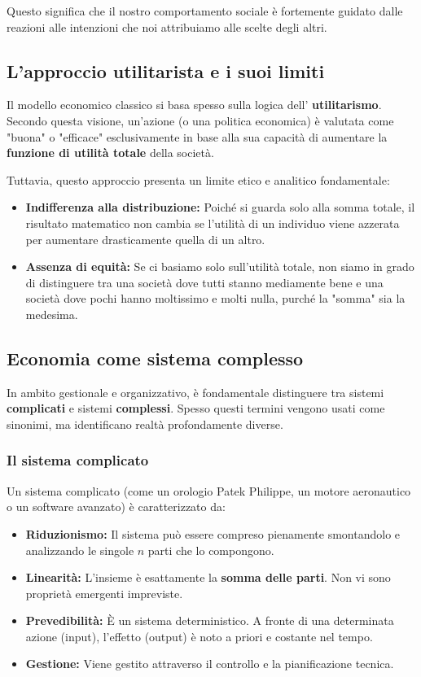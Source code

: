 \documentclass[a4paper,12pt]{article}
\begin{document}
	Questo significa che il nostro comportamento sociale è fortemente guidato dalle reazioni alle intenzioni che noi attribuiamo alle scelte degli altri.
	\subsection{L'approccio utilitarista e i suoi limiti}
	Il modello economico classico si basa spesso sulla logica dell' \textbf{utilitarismo}. Secondo questa visione, un'azione (o una politica economica) è valutata come "buona" o "efficace" esclusivamente in base alla sua capacità di aumentare la \textbf{funzione di utilità totale} della società.
	
	Tuttavia, questo approccio presenta un limite etico e analitico fondamentale:
	\begin{itemize}
		\item \textbf{Indifferenza alla distribuzione:} Poiché si guarda solo alla somma totale, il risultato matematico non cambia se l'utilità di un individuo viene azzerata per aumentare drasticamente quella di un altro. 
		\item \textbf{Assenza di equità:} Se ci basiamo solo sull'utilità totale, non siamo in grado di distinguere tra una società dove tutti stanno mediamente bene e una società dove pochi hanno moltissimo e molti nulla, purché la "somma" sia la medesima.
	\end{itemize}
	
	\subsection{Economia come sistema complesso}
	In ambito gestionale e organizzativo, è fondamentale distinguere tra sistemi \textbf{complicati} e sistemi \textbf{complessi}. Spesso questi termini vengono usati come sinonimi, ma identificano realtà profondamente diverse.
	
	\subsubsection{Il sistema complicato}
	Un sistema complicato (come un orologio Patek Philippe, un motore aeronautico o un software avanzato) è caratterizzato da:
	\begin{itemize}
		\item \textbf{Riduzionismo:} Il sistema può essere compreso pienamente smontandolo e analizzando le singole $n$ parti che lo compongono.
		\item \textbf{Linearità:} L'insieme è esattamente la \textbf{somma delle parti}. Non vi sono proprietà emergenti impreviste.
		\item \textbf{Prevedibilità:} È un sistema deterministico. A fronte di una determinata azione (input), l'effetto (output) è noto a priori e costante nel tempo.
		\item \textbf{Gestione:} Viene gestito attraverso il controllo e la pianificazione tecnica.
	\end{itemize}
	
\end{document}
